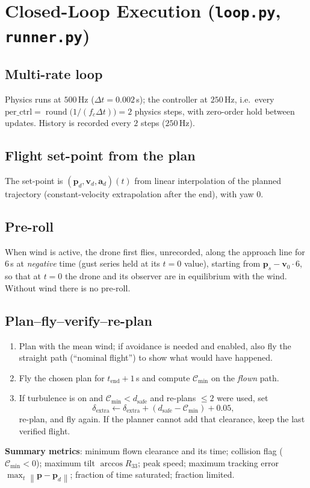 \documentclass[11pt,a4paper]{article}
\newcommand{\vc}[1]{\bm{#1}}
\newcommand{\norm}[1]{\left\lVert #1\right\rVert}
\newcommand{\code}[1]{\texttt{\small #1}}
\begin{document}
\section{Closed-Loop Execution (\code{loop.py}, \code{runner.py})}
\subsection{Multi-rate loop}
Physics runs at $500$\,Hz ($\Delta t=0.002$\,s); the controller at $250$\,Hz, i.e.\ every
$\text{per\_ctrl}=\operatorname{round}\bigl(1/(f_c\Delta t)\bigr)=2$ physics steps, with zero-order hold between updates. History is recorded every $2$ steps ($250$\,Hz).

\subsection{Flight set-point from the plan}
The set-point is $(\vc p_d,\vc v_d,\vc a_d)(t)$ from linear interpolation of the planned trajectory (constant-velocity extrapolation after the end), with yaw $0$.

\subsection{Pre-roll}
When wind is active, the drone first flies, unrecorded, along the approach line for $6$\,s at \emph{negative} time (gust series held at its $t=0$ value), starting from $\vc p_s-\vc v_0\cdot6$, so that at $t=0$ the drone and its observer are in equilibrium with the wind. Without wind there is no pre-roll.

\subsection{Plan--fly--verify--re-plan}
\begin{enumerate}
\item Plan with the mean wind; if avoidance is needed and enabled, also fly the straight path (``nominal flight'') to show what would have happened.
\item Fly the chosen plan for $t_{\text{end}}+1$\,s and compute $\mathcal C_{\min}$ on the \emph{flown} path.
\item If turbulence is on and $\mathcal C_{\min}<d_{\text{safe}}$ and re-plans $\le2$ were used, set
\begin{equation}
\delta_{\text{extra}}\leftarrow\delta_{\text{extra}}+(d_{\text{safe}}-\mathcal C_{\min})+0.05,
\end{equation}
re-plan, and fly again. If the planner cannot add that clearance, keep the last verified flight.
\end{enumerate}
\textbf{Summary metrics}: minimum flown clearance and its time; collision flag ($\mathcal C_{\min}<0$); maximum tilt $\arccos R_{33}$; peak speed; maximum tracking error $\max_t\norm{\vc p-\vc p_d}$; fraction of time saturated; fraction limited.
\end{document}
